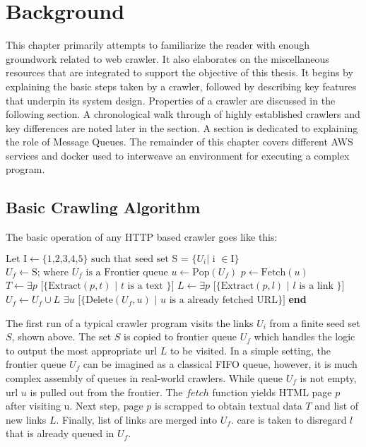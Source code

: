 \chapter{Background}
This chapter primarily attempts to familiarize the reader with enough groundwork related to web crawler. It
also elaborates on the miscellaneous resources that are integrated to support the objective of this thesis.
It begins by explaining the basic steps taken by a crawler, followed by describing key features that
underpin its system design. Properties of a crawler are discussed in the following section. A
chronological walk through of highly established crawlers and key differences are noted later in the
section. A section is dedicated to explaining the role of Message Queues. The remainder of this chapter covers
different AWS services and docker used to interweave an environment for executing a complex program.


\section{Basic Crawling Algorithm}\label{basicalgo}
The basic operation of any HTTP based crawler goes like this:
\begin{algorithm}
\begin{algorithmic}[1]
  \State $\text{Let I} \gets \text{\{1,2,3,4,5\}} \text{ such that seed set S = \{} U_i \text{| i } \in \text{I\}}$
  \State $U_f \gets \text{S; where } U_f \text{ is a Frontier queue}$
    \State $u \gets \text{Pop}(U_f)$ 
    \State $p \gets \text{Fetch}(u)$
    \State $T \gets \exists p\text{ [\{Extract}(p, t) \text{ | } t \text{ is a text \}]}$
    \State $L \gets \exists p\text{ [\{Extract}(p, l) \text{ | } l \text{ is a link \}]}$
    \State $U_f \gets U_f \cup L$
    \State $\exists u\text{ [\{Delete}(U_f, u) \text{ | } u \text{ is a already fetched URL\}]}$
  \EndWhile
\EndProcedure
\State \textbf{end}
\end{algorithmic}
\end{algorithm}

\noindent
The first run of a typical crawler program visits the links $U_i$ from a finite seed set $S$, shown above. 
The set $S$ is copied to frontier queue $U_f$ which handles the logic to output the most appropriate url $L$ to be visited. In a simple setting, the frontier queue $U_f$ can be imagined as a classical FIFO queue,
however, it is much complex assembly of queues in real-world crawlers. While queue $U_f$ is not empty, url $u$ is pulled out from the frontier. The $fetch$ function yields HTML page $p$ after visiting u. Next step,
page $p$ is scrapped to obtain textual data $T$ and list of new links $L$. Finally, list of links are merged into $U_f$. care is taken to disregard $l$ that is already queued in $U_f$.

